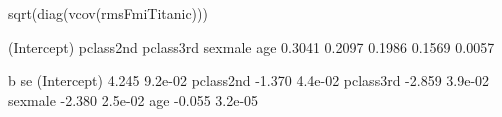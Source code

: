 \begin{Schunk}
\begin{Sinput}
 sqrt(diag(vcov(rmsFmiTitanic)))
\end{Sinput}
\begin{Soutput}
(Intercept)   pclass2nd   pclass3rd     sexmale         age 
     0.3041      0.2097      0.1986      0.1569      0.0057 
\end{Soutput}
\begin{Soutput}
                 b      se
(Intercept)  4.245 9.2e-02
pclass2nd   -1.370 4.4e-02
pclass3rd   -2.859 3.9e-02
sexmale     -2.380 2.5e-02
age         -0.055 3.2e-05
\end{Soutput}
\end{Schunk}
